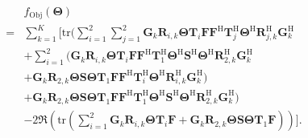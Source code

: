 \documentclass[journal]{IEEEtran}
\begin{document}
\begin{equation}\begin{aligned}  & f_{\mathrm{ Obj}} ( \boldsymbol {\Theta })
     \\=&\sum _{k = 1}^{K}[\mathrm{tr}(\sum _{i = 1}^{2}\sum _{j = 1}^{2}{\mathbf{G}_{k}}\mathbf {R}_{i,k} \boldsymbol {\Theta }\mathbf {T}_{i} {\mathbf{F}}{\mathbf{F}}^{\mathrm {H}}\mathbf {T}_{j}^{\mathrm{H}} \boldsymbol {\Theta }^{\mathrm {H}}\mathbf {R}_{j,k}^{\mathrm{H}}\mathbf {G}_{k}^{\mathrm{H}}
     \\&+\sum _{i = 1}^{2}({\mathbf{G}_{k}}\mathbf {R}_{i,k} \boldsymbol {\Theta }\mathbf {T}_{i} {\mathbf{F}}{\mathbf{F}}^{\mathrm {H}}\mathbf {T}_{1}^{\mathrm{H}} \boldsymbol {\Theta }^{\mathrm {H}}\mathbf{S}^{\mathrm{H}} \boldsymbol {\Theta }^{\mathrm {H}}\mathbf {R}_{2,k}^{\mathrm{H}}\mathbf {G}_{k}^{\mathrm{H}}
      \\&+{\mathbf{G}_{k}}\mathbf {R}_{2,k} \boldsymbol {\Theta }\mathbf{S} \boldsymbol {\Theta }\mathbf {T}_{1} {\mathbf{F}}{\mathbf{F}}^{\mathrm {H}}\mathbf {T}_{i}^{\mathrm{H}} \boldsymbol {\Theta }^{\mathrm {H}} \mathbf {R}_{i,k}^{\mathrm{H}}\mathbf {G}_{k}^{\mathrm{H}})
    \\&+{\mathbf{G}_{k}}\mathbf {R}_{2,k} \boldsymbol {\Theta }\mathbf{S} \boldsymbol {\Theta }\mathbf {T}_{1} {\mathbf{F}}{\mathbf{F}}^{\mathrm {H}}\mathbf {T}_{1}^{\mathrm{H}} \boldsymbol {\Theta }^{\mathrm {H}}\mathbf{S}^{\mathrm{H}} \boldsymbol {\Theta }^{\mathrm {H}}\mathbf {R}_{2,k}^{\mathrm{H}}\mathbf {G}_{k}^{\mathrm{H}})
    \\&-2{\Re}(\mathrm {tr}(\sum _{i = 1}^{2}\mathbf{G}_{k}\mathbf {R}_{i,k} \boldsymbol {\Theta }\mathbf {T}_{i} {\mathbf{F}}\!+\!{\mathbf{G}_{k}}\mathbf {R}_{2,k} \boldsymbol {\Theta }\mathbf{S} \boldsymbol {\Theta }\mathbf {T}_{1}{\mathbf{F}}))].
    \end{aligned}\end{equation}
\end{document}
